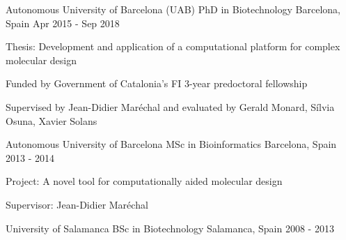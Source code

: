 \begin{cventries}
  \cventry
    {Autonomous University of Barcelona (UAB)} %
    {PhD in Biotechnology} %
    {Barcelona, Spain} %
    {Apr 2015 - Sep 2018} %
    {
      \begin{cvitems} %
        \item {Thesis: Development and application of a computational platform for complex molecular design}
        \item {Funded by Government of Catalonia's FI 3-year predoctoral fellowship}
        \item {Supervised by Jean-Didier Maréchal and evaluated by Gerald Monard, Sílvia Osuna, Xavier Solans\\}
      \end{cvitems}
    }

  \cventry
    {Autonomous University of Barcelona} %
    {MSc in Bioinformatics} %
    {Barcelona, Spain} %
    {2013 - 2014} %
    {
      \begin{cvitems} %
        \item {Project: A novel tool for computationally aided molecular design}
        \item {Supervisor: Jean-Didier Maréchal\\}
      \end{cvitems}
    }

  \cventry
    {University of Salamanca} %
    {BSc in Biotechnology} %
    {Salamanca, Spain} %
    {2008 - 2013} %
    {~}

\end{cventries}
